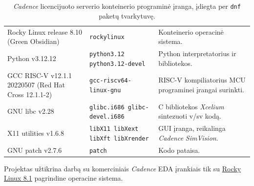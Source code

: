 \begin{table}[H]
	\caption{\textit{Cadence} licencijuoto serverio konteinerio programinė įranga, įdiegta per \texttt{dnf} paketų tvarkytuvę.}
	\label{tab:project-software-rockylinux}
	\begin{tabularx}{\linewidth}{|>{\raggedright\arraybackslash}p{4cm}|X|>{\raggedright\arraybackslash}X|}
		\hline
		\thead[l]{Programinė įranga} & \thead{Paketo pavadinimas} & \thead{Paskirtis} \\ \hline
		Rocky Linux release 8.10 (Green Obsidian) & \texttt{rockylinux} & Konteinerio operacinė sistema. \\ \hline
		Python v3.12.12 & \texttt{python3.12 python3.12-devel} & Python interpretatorius ir bibliotekos. \\ \hline
		GCC RISC-V v12.1.1 20220507 (Red Hat Cross 12.1.1-2) & \texttt{gcc-riscv64-linux-gnu} & RISC-V kompiliatorius MCU programinei įrangai surinkti. \\ \hline
		GNU libc v2.28 & \texttt{glibc.i686 glibc-devel.i686} & C bibliotekos \textit{Xcelium} sintezuoti \gls{v/sv} kodą. \\ \hline
		X11 utilities v1.6.8 & \texttt{libX11 libXext libXft libXrender} & GUI įranga, reikalinga \textit{Cadence} \textit{SimVision}. \\ \hline
		GNU patch v2.7.6 & \texttt{patch} & Kodo pataisa. \\ \hline
	\end{tabularx}
\end{table}

Projektas užtikrina darbą su komerciniais \textit{Cadence} EDA įrankiais \lent{\ref{tab:project-software-rockylinux}} tik su \hyperref[rockylinux]{Rocky Linux 8.1} pagrindine operacine sistema.


